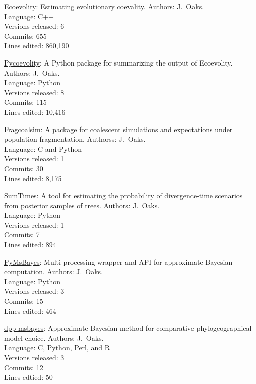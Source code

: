 \myHangIndent
\href{https://github.com/phyletica/ecoevolity}{Ecoevolity}:
    Estimating evolutionary coevality.
    Authors: J.\ Oaks. \\
    Language: C++ \\
    Versions released: 6 \\
    Commits: 655 \\
    Lines edited: 860,190

\myHangIndent
\href{https://github.com/phyletica/sumcoevolity}{Pycoevolity}:
    A Python package for summarizing the output of Ecoevolity.
    Authors: J.\ Oaks. \\
    Language: Python \\
    Versions released: 8 \\
    Commits: 115 \\
    Lines edited: 10,416

\myHangIndent
\href{https://github.com/joaks1/fragcoalsim}{Fragcoalsim}:
    A package for coalescent simulations and expectations under population
    fragmentation.
    Authorss: J.\ Oaks. \\
    Language: C and Python \\
    Versions released: 1 \\
    Commits: 30 \\
    Lines edited: 8,175

\myHangIndent
\href{https://github.com/phyletica/SumTimes}{SumTimes}:
    A tool for estimating the probability of divergence-time scenarios from
    posterior samples of trees.
    Authors: J.\ Oaks. \\
    Language: Python \\
    Versions released: 1 \\
    Commits: 7 \\
    Lines edited: 894

\myHangIndent
\href{https://github.com/joaks1/PyMsBayes}{PyMsBayes}:
    Multi-processing wrapper and API for approximate-Bayesian
    computation.
    Authors: J.\ Oaks. \\
    Language: Python \\
    Versions released: 3 \\
    Commits: 15 \\
    Lines edited: 464

\myHangIndent
\href{https://github.com/joaks1/dpp-msbayes}{dpp-msbayes}:
    Approximate-Bayesian method for comparative phylogeographical model choice.
    Authors: J.\ Oaks. \\
    Language: C, Python, Perl, and R \\
    Versions released: 3 \\
    Commits: 12 \\
    Lines edtied: 50

